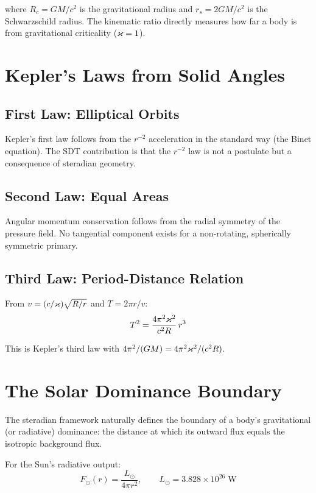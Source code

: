 where $R_c = GM/c^2$ is the gravitational radius and $r_s = 2GM/c^2$ is the Schwarzschild radius. The kinematic ratio directly measures how far a body is from gravitational criticality ($\varkappa = 1$).


\section{Kepler's Laws from Solid Angles}

\subsection{First Law: Elliptical Orbits}

Kepler's first law follows from the $r^{-2}$ acceleration in the standard way (the Binet equation). The SDT contribution is that the $r^{-2}$ law is not a postulate but a consequence of steradian geometry.

\subsection{Second Law: Equal Areas}

Angular momentum conservation follows from the radial symmetry of the pressure field. No tangential component exists for a non-rotating, spherically symmetric primary.

\subsection{Third Law: Period-Distance Relation}

From $v = (c/\varkappa)\sqrt{R/r}$ and $T = 2\pi r/v$:
\begin{equation}
  T^2 = \frac{4\pi^2 \varkappa^2}{c^2 R}\,r^3
\end{equation}

This is Kepler's third law with $4\pi^2/(GM) = 4\pi^2\varkappa^2/(c^2 R)$.


\section{The Solar Dominance Boundary}
\label{sec:solar-boundary}

The steradian framework naturally defines the boundary of a body's gravitational (or radiative) dominance: the distance at which its outward flux equals the isotropic background flux.

For the Sun's radiative output:
\begin{equation}
  F_\odot(r) = \frac{L_\odot}{4\pi r^2}, \qquad L_\odot = 3.828 \times 10^{26}\;\text{W}
\end{equation}

